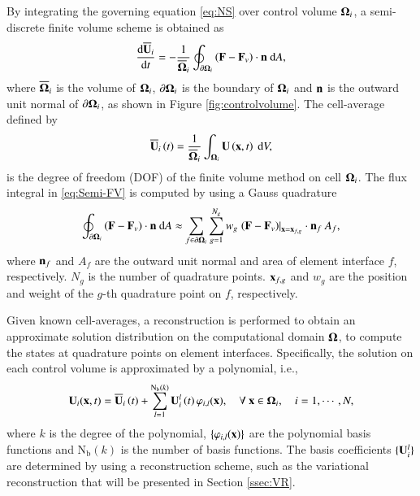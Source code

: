 By integrating the governing equation \eqref{eq:NS} over control volume $\mathbf{\Omega}_i$, a semi-discrete finite volume scheme is obtained as
\begin{equation}
    \label{eq:Semi-FV}
    \dfrac{ \dd\overline{\mathbf{U}}_i }{\dd t} = -\dfrac{1}{\overline{\mathbf{\Omega}}_i} \oint_{\partial \mathbf{\Omega}_i} \left(\mathbf{F} - \mathbf{F}_v \right) \cdot \mathbf{n} \ \dd A,
\end{equation}
where $\overline{\mathbf{\Omega}}_i$ is the volume of $\mathbf{\Omega}_i$, $\partial \mathbf{\Omega}_i$ is the boundary of $\mathbf{\Omega}_i$ and $\mathbf{n}$ is the outward unit normal of $\partial \mathbf{\Omega}_i$, as shown in Figure \ref{fig:controlvolume}. The cell-average defined by
\begin{equation}
    \label{eq:FVMean}
    \overline{\mathbf{U}}_i \left(t\right)= \frac{1}{\overline{\mathbf{\Omega}}_i}\int_{\mathbf{\Omega}_i}\mathbf{U} \left(\mathbf{x},t\right)\ \dd V,
\end{equation}
is the degree of freedom (DOF) of the finite volume method on cell $\mathbf{\Omega}_i$.
The flux integral in \eqref{eq:Semi-FV} is computed by using a Gauss quadrature
\begin{equation}
    \label{eq:Flux-Integral}
    \oint_{\partial \mathbf{\Omega}_i} \left(\mathbf{F} - \mathbf{F}_v \right) \cdot \mathbf{n} \ \dd A \approx \sum_{f \in \partial \mathbf{\Omega}_i} \sum_{g=1}^{N_g} w_g \left. \left(\mathbf{F} - \mathbf{F}_v \right)\right|_{\mathbf{x}=\mathbf{x}_{f,g}} \cdot \mathbf{n}_f \ A_f,
\end{equation}
where $\mathbf{n}_f$ and $A_f$ are the outward unit normal and area of element interface $f$, respectively. $N_g$ is the number of quadrature points. $\mathbf{x}_{f,g}$ and $w_g$ are the position and weight of the $g$-th quadrature point on $f$, respectively.

Given known cell-averages, a reconstruction is performed to obtain an approximate solution distribution on the computational domain $\mathbf{\Omega}$, to compute the states at quadrature points on element interfaces. Specifically, the solution on each control volume is approximated by a polynomial, i.e.,
\begin{equation}
    \label{eq:FVRec}
    \mathbf{U}_i(\mathbf{x},t) = \overline{\mathbf{U}}_i \left(t\right) + \sum_{l=1}^{\mathrm{N_b}(k)}{\mathbf{U}_i^l \left(t\right) \varphi_{i,l}(\mathbf{x}) }, \quad \forall \ \mathbf{x} \in \mathbf{\Omega}_i, \quad i=1, \cdots, N,
\end{equation}
where $k$ is the degree of the polynomial, $\{\varphi_{i,l}(\mathbf{x})\}$ are the polynomial basis functions and $\mathrm{N_b}(k)$ is the number of basis functions. The basis coefficients $\{\mathbf{U}^l_i\}$ are determined by using a reconstruction scheme, such as the variational reconstruction \cite{wang2017compact_VR} that will be presented in Section \ref{ssec:VR}.

